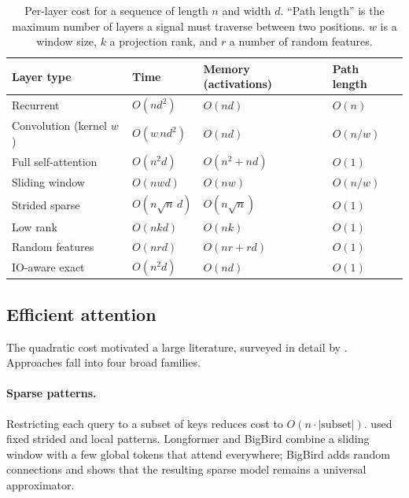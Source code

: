 \documentclass[11pt]{article}
\begin{document}
\begin{table}[t]
  \centering
  \caption{Per-layer cost for a sequence of length $n$ and width $d$. ``Path length'' is the maximum number of layers a signal must traverse between two positions. $w$ is a window size, $k$ a projection rank, and $r$ a number of random features.}
  \label{tab:complexity}
  \begin{tabular}{@{}llll@{}}
    \toprule
    Layer type & Time & Memory (activations) & Path length \\
    \midrule
    Recurrent & $O(n d^2)$ & $O(n d)$ & $O(n)$ \\
    Convolution (kernel $w$) & $O(w\, n d^2)$ & $O(n d)$ & $O(n / w)$ \\
    Full self-attention & $O(n^2 d)$ & $O(n^2 + n d)$ & $O(1)$ \\
    Sliding window \citep{beltagy2020longformer} & $O(n w d)$ & $O(n w)$ & $O(n / w)$ \\
    Strided sparse \citep{child2019generating} & $O(n \sqrt{n}\, d)$ & $O(n \sqrt{n})$ & $O(1)$ \\
    Low rank \citep{wang2020linformer} & $O(n k d)$ & $O(n k)$ & $O(1)$ \\
    Random features \citep{choromanski2021rethinking} & $O(n r d)$ & $O(n r + r d)$ & $O(1)$ \\
    IO-aware exact \citep{dao2022flashattention} & $O(n^2 d)$ & $O(n d)$ & $O(1)$ \\
    \bottomrule
  \end{tabular}
\end{table}

\subsection{Efficient attention}
\label{sec:efficient}

The quadratic cost motivated a large literature, surveyed in detail by \citet{tay2022efficient}. Approaches fall into four broad families.

\paragraph{Sparse patterns.} Restricting each query to a subset of keys reduces cost to $O(n \cdot |\text{subset}|)$. \citet{child2019generating} used fixed strided and local patterns. Longformer \citep{beltagy2020longformer} and BigBird \citep{zaheer2020bigbird} combine a sliding window with a few global tokens that attend everywhere; BigBird adds random connections and shows that the resulting sparse model remains a universal approximator.
\end{document}
